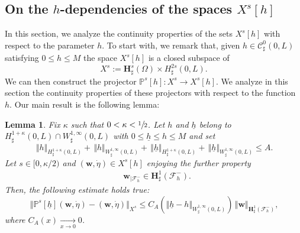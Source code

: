 \documentclass[11pt]{article}
\let\mathcal\mathscr
\newtheorem{lemma}[theorem]{Lemma}
\theoremstyle{remark}
\theoremstyle{definition}
\newcommand{\norme}[1]{\,\Vert #1\Vert}
\newcommand{\vnorme}[1]{\Vert #1\Vert}
\newcommand{\wg}{\boldsymbol{w}}
\newcommand{\BS}[1]{\boldsymbol{#1}}
\newcommand{\etap}{\dot{\eta}}
\newcommand{\hb}{{\underline{h}}}
\begin{document}
\subsection{On the $h$-dependencies of the spaces $X^s[h]$}
\label{continuite_h}
In this section, we analyze the continuity properties of the sets $X^s[h]$ with respect to the parameter $h$.
To start with, we remark that, given $h \in \mathcal{C}^0_{\sharp}(0,L)$ satisfying $0 \leq h \leq M$ the space
$X^s[h]$ is a closed subspace of
\[
X^s := \BS{H}^s_{\sharp}(\Omega) \times H^{2s}_{\sharp}(0,L).
\]
We can then construct the projector $\mathbb P^s[h] : X^s \to X^s[h]$. We analyze in this section the continuity
properties of these projectors with respect to the function $h$. Our main result is the following lemma:

\begin{lemma} \label{lem:projector}
Fix $\kappa$ such that $0<\kappa<\sfrac{1}{2}$. Let $h$ and $\hb$ belong to $H_\sharp^{1+\kappa}(0,L)\cap W_\sharp^{1,\infty}(0,L)$ with $0\leq \hb\leq h\leq M$ and set
\begin{equation}
\label{borne:A}\norme{h}_{H^{1+\kappa}_{\sharp}(0,L)}+\norme{h}_{W^{1,\infty}_{\sharp}(0,L)}+\norme{\hb}_{H^{1+\kappa}_{\sharp}(0,L)}+\norme{\hb}_{W^{1,\infty}_{\sharp}(0,L)}\leq A.
\end{equation}
Let $s \in [0,\kappa/2)$ and $(\wg,\etap) \in X^s[h]$ enjoying the further property
\begin{eqnarray}
&\wg_{\vert\mathcal{F}_{h}^{-}}\in \BS{H}^{1}_{\sharp}(\mathcal{F}^{-}_{h}).\label{hyp-Ps2}
\end{eqnarray}
Then, the following estimate holds true:
\begin{equation}\label{est.projector.main}
\norme{\mathbb{P}^{s}[\hb](\wg,\etap) -(\wg,\etap)}_{X^s}\leq C_{A}(\vnorme{\hb -h }_{W^{1,\infty}_{\sharp}(0,L)})\norme{\wg}_{\BS{H}^{1}_{\sharp}(\mathcal{F}^{-}_{h})},
\end{equation}
where $C_{A}(x)\underset{x\to 0}{\to}0$.
\end{lemma}
\end{document}
